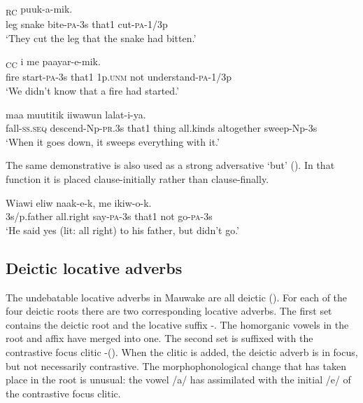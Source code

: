\ea%
\label{ex:3:x687}
\textsubscript{RC} puuk-a-mik. \\
leg snake bite-\textsc{pa}-3s that1 cut-\textsc{pa}-1/3p\\
\glt`They cut the leg that the snake had bitten.'
\z

\ea%
\label{ex:3:x689}
\textsubscript{CC} i me paayar-e-mik. \\
fire start-\textsc{pa}-3s that1 1p.\textsc{unm} not understand-\textsc{pa}-1/3p\\
\glt`We didn't know that a fire had started.'
\z

\ea%
\label{ex:3:x688}
 maa muutitik iiwawun lalat-i-ya.\\
fall-\textsc{ss}.\textsc{seq} descend-Np-\textsc{pr}.3s that1 thing all.kinds altogether sweep-Np-3s\\
\glt`When it goes down, it sweeps everything with it.'
\z

The same demonstrative is also used as a strong adversative `but'  (). In that function it is placed clause-initially rather than clause-finally.

\ea%
\label{ex:3:x690}
\gll Wiawi eliw naak-e-k,  me ikiw-o-k. \\
3s/p.father all.right say-\textsc{pa}-3s that1 not go-\textsc{pa}-3s\\
\glt`He said yes (lit: all right) to his father, but didn't go.'
\z

\subsection{Deictic locative adverbs} \label{sec:3.6.3}
{}
The undebatable locative adverbs in Mauwake are all deictic (). For each of the four deictic roots there are two corresponding locative adverbs. The first set contains the deictic root and the locative suffix -. The homorganic vowels in the root and affix have merged into one. The second set is suffixed with the contrastive focus clitic -(). When the clitic is added, the deictic adverb is in focus, but not necessarily contrastive. The morphophonological change that has taken place in the root is unusual: the vowel /a/ has assimilated with the initial /e/ of the contrastive focus clitic. 

